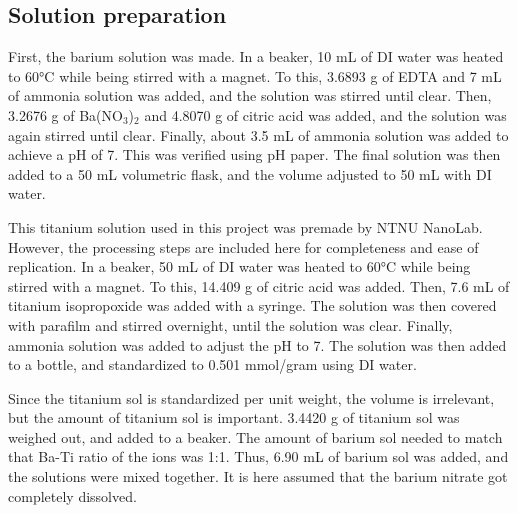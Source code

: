 \subsection{Solution preparation}

\noindent First, the barium solution was made.
In a beaker, 10 mL of DI water was heated to 60°C while being stirred with a magnet.
To this, 3.6893 g of EDTA and 7 mL of ammonia solution was added, and the solution was stirred until clear.
Then, 3.2676 g of Ba(NO$_3$)$_2$ and 4.8070 g of citric acid was added, and the solution was again stirred until clear.
Finally, about 3.5 mL of ammonia solution was added to achieve a pH of 7.
This was verified using pH paper.
The final solution was then added to a 50 mL volumetric flask, and the volume adjusted to 50 mL with DI water.


This titanium solution used in this project was premade by NTNU NanoLab.
However, the processing steps are included here for completeness and ease of replication.
In a beaker, 50 mL of DI water was heated to 60°C while being stirred with a magnet.
To this, 14.409 g of citric acid was added.
Then, 7.6 mL of titanium isopropoxide was added with a syringe.
The solution was then covered with parafilm and stirred overnight, until the solution was clear.
Finally, ammonia solution was added to adjust the pH to 7.
The solution was then added to a bottle, and standardized to 0.501 mmol/gram using DI water.

Since the titanium sol is standardized per unit weight, the volume is irrelevant, but the amount of titanium sol is important.
3.4420 g of titanium sol was weighed out, and added to a beaker.
The amount of barium sol needed to match that Ba-Ti ratio of the ions was 1:1.
Thus, 6.90 mL of barium sol was added, and the solutions were mixed together. %
It is here assumed that the barium nitrate got completely dissolved.


